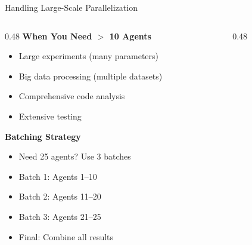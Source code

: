 \documentclass[aspectratio=169,11pt]{beamer}
\begin{document}
\begin{frame}{Handling Large-Scale Parallelization}
    \begin{columns}[T]
        \begin{column}{0.48\textwidth}
            \textbf{When You Need $>$ 10 Agents}
            \begin{itemize}
                \item Large experiments (many parameters)
                \item Big data processing (multiple datasets)
                \item Comprehensive code analysis
                \item Extensive testing
            \end{itemize}

            \vspace{0.2cm}
            \textbf{Batching Strategy}
            \begin{itemize}
                \footnotesize
                \item Need 25 agents? Use 3 batches
                \item Batch 1: Agents 1--10
                \item Batch 2: Agents 11--20
                \item Batch 3: Agents 21--25
                \item Final: Combine all results
            \end{itemize}
        \end{column}
        \begin{column}{0.48\textwidth}
\end{column}
\end{columns}
\end{frame}
\end{document}
